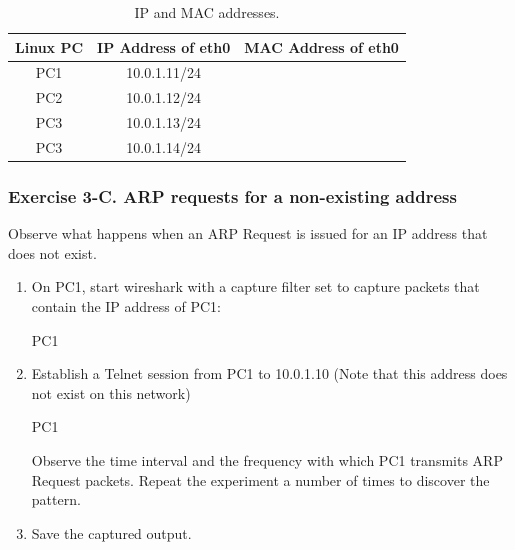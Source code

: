 \begin{table}[h!t]
	\centering
	\begin{tabular}{| c | c | c |}	
		\hline
		\textbf{Linux PC} & \textbf{IP Address of eth0} & \textbf{MAC Address of eth0} \\ \hline
		PC1 & 10.0.1.11/24 & \\ 
		PC2 & 10.0.1.12/24 & \\
		PC3 & 10.0.1.13/24 & \\
		PC3 & 10.0.1.14/24 & \\ \hline
	\end{tabular}
	\caption{ IP and MAC addresses.}
	\label{tab:lab2-ip-to-mac}
\end{table}

\begin{questions}
\end{questions}

\subsubsection*{Exercise 3-C. ARP requests for a non-existing address}

Observe what happens when an ARP Request is issued for an IP address that does not exist.

\begin{enumerate}
	\item On PC1, start wireshark with a capture filter set to capture packets that contain the IP address of PC1:
		\begin{cmdblock}
	PC1%
		\end{cmdblock}
	\item Establish a Telnet session from PC1 to 10.0.1.10 (Note that this address does not exist on this network)
		\begin{cmdblock}
	PC1%
		\end{cmdblock}
		Observe the time interval and the frequency with which PC1 transmits ARP Request packets. Repeat the experiment a number of times to discover the pattern.
	\item Save the captured output.
\end{enumerate}

\begin{questions}
\end{questions}

